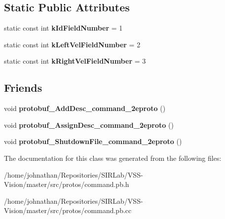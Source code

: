 \subsection*{Static Public Attributes}
\begin{DoxyCompactItemize}
\item 
static const int {\bfseries k\+Id\+Field\+Number} = 1\hypertarget{classvss__command_1_1Robot__Command_a72d358bc06840eb9b5835ad46cee4620}{}\label{classvss__command_1_1Robot__Command_a72d358bc06840eb9b5835ad46cee4620}

\item 
static const int {\bfseries k\+Left\+Vel\+Field\+Number} = 2\hypertarget{classvss__command_1_1Robot__Command_a834467a27672508216892c745d78bad4}{}\label{classvss__command_1_1Robot__Command_a834467a27672508216892c745d78bad4}

\item 
static const int {\bfseries k\+Right\+Vel\+Field\+Number} = 3\hypertarget{classvss__command_1_1Robot__Command_adb4e9f137218f7bf68ba93029e028e40}{}\label{classvss__command_1_1Robot__Command_adb4e9f137218f7bf68ba93029e028e40}

\end{DoxyCompactItemize}
\subsection*{Friends}
\begin{DoxyCompactItemize}
\item 
void {\bfseries protobuf\+\_\+\+Add\+Desc\+\_\+command\+\_\+2eproto} ()\hypertarget{classvss__command_1_1Robot__Command_a4825d92f856fcb4b02c67b601c433796}{}\label{classvss__command_1_1Robot__Command_a4825d92f856fcb4b02c67b601c433796}

\item 
void {\bfseries protobuf\+\_\+\+Assign\+Desc\+\_\+command\+\_\+2eproto} ()\hypertarget{classvss__command_1_1Robot__Command_a4c6fb97c25079d49daf010087d869100}{}\label{classvss__command_1_1Robot__Command_a4c6fb97c25079d49daf010087d869100}

\item 
void {\bfseries protobuf\+\_\+\+Shutdown\+File\+\_\+command\+\_\+2eproto} ()\hypertarget{classvss__command_1_1Robot__Command_a4cf10633ad46690f5eec6bdbbcf62de0}{}\label{classvss__command_1_1Robot__Command_a4cf10633ad46690f5eec6bdbbcf62de0}

\end{DoxyCompactItemize}


The documentation for this class was generated from the following files\+:\begin{DoxyCompactItemize}
\item 
/home/johnathan/\+Repositories/\+S\+I\+R\+Lab/\+V\+S\+S-\/\+Vision/master/src/protos/command.\+pb.\+h\item 
/home/johnathan/\+Repositories/\+S\+I\+R\+Lab/\+V\+S\+S-\/\+Vision/master/src/protos/command.\+pb.\+cc\end{DoxyCompactItemize}
